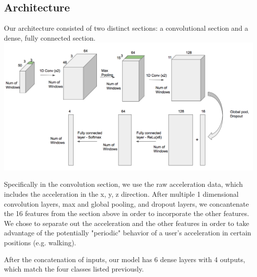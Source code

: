 \subsection{Architecture}
Our architecture consisted of two distinct sections: a convolutional section and a dense, fully connected section. 
\includegraphics{convnet}

Specifically in the convolution section, we use the raw acceleration data, which includes the acceleration in the x, y, z direction. 
After multiple 1 dimensional convolution layers, max and global pooling, and dropout layers, we concantenate the 16 features from the section above in order to incorporate the other features. 
We chose to separate out the acceleration and the other features in order to take advantage of the potentially "periodic" behavior of a user's acceleration in certain positions (e.g. walking).

After the concatenation of inputs, our model has 6 dense layers with 4 outputs, which match the four classes listed previously. 